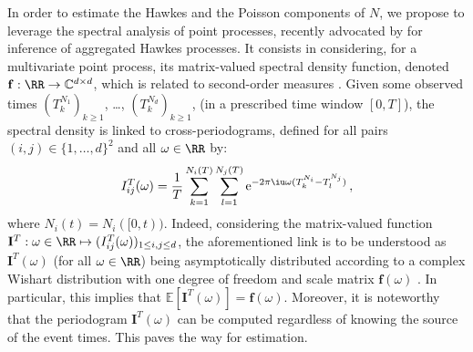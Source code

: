         In order to estimate the Hawkes and the Poisson components of $N$,
        we propose to leverage the spectral analysis of point processes,
        recently advocated by \textcite{Cheysson2022} for inference of aggregated Hawkes processes.        
        It consists in considering, for a multivariate point process, its matrix-valued spectral density function, denoted $\mathbf f : \RR \to \mathbb C^{d \times d}$,
        which is related to second-order measures \parencite{Bartlett1963}.
        Given some observed
        times $(T_k^{N_1})_{k\ge1}$, \dots, $(T_k^{N_d})_{k\ge1}$,
        (in a prescribed time window $[0, T]$),
        the spectral density is linked to cross-periodograms,
        defined for all pairs $(i, j) \in \{1, \dots, d\}^2$ and all $\omega \in \RR$ by:
        \begin{equation}\label{eq:chap3_multivariate_periodogram}
          I_{ij}^T(\omega) = \frac{1}{T}\sum_{k=1}^{N_i(T)}\sum_{l=1}^{N_j(T)}\mathrm{e}^{-2 \pi \iu \omega (T_k^{N_i} - T_l^{N_j})}\,,
        \end{equation}
        where $N_i(t) = N_i([0, t))$.
        Indeed, considering the matrix-valued function $\mathbf I^T : \omega \in \RR \mapsto (I_{ij}^T(\omega))_{1 \le i, j \le d}$,
        the aforementioned link is to be understood as $\mathbf I^T(\omega)$ (for all $\omega \in\RR$) being asymptotically distributed according to a complex Wishart distribution with one degree of freedom and scale matrix $\mathbf f(\omega)$ \parencite{Tuan1981, Villani2022}.
        In particular, this implies that \(\mathbb E [\mathbf I^T(\omega)] = \mathbf f(\omega)\).
        Moreover, it is noteworthy that the periodogram $\mathbf I^T(\omega)$ can be computed regardless of knowing the source of the event times.
        This paves the way for estimation.
        
